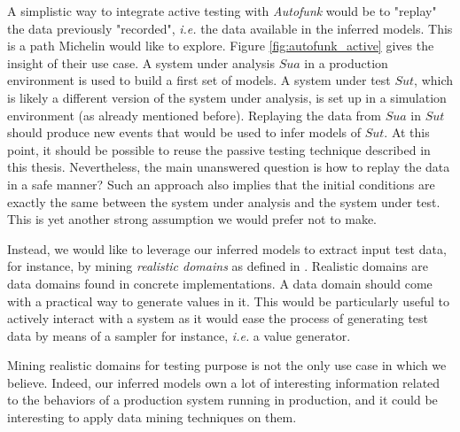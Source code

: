 A simplistic way to integrate active testing with \emph{Autofunk}
would be to "replay"
\cite{thane2000using,Orso:2005:SCR:1082983.1083251} the data
previously "recorded", \emph{i.e.} the data available in the
inferred models. This is a path Michelin would like to explore.
Figure \ref{fig:autofunk_active} gives the insight of their use
case. A system under analysis $\mathit{Sua}$ in a production
environment is used to build a first set of models. A system
under test $\mathit{Sut}$, which is likely a different version of
the system under analysis, is set up in a simulation environment
(as already mentioned before).  Replaying the data from
$\mathit{Sua}$ in $\mathit{Sut}$ should produce new events that
would be used to infer models of $\mathit{Sut}$.  At this point,
it should be possible to reuse the passive testing technique
described in this thesis.  Nevertheless, the main unanswered
question is how to replay the data in a safe manner?  Such an
approach also implies that the initial conditions are exactly the
same between the system under analysis and the system under test.
This is yet another strong assumption we would prefer not to
make.

Instead, we would like to leverage our inferred models to extract
input test data, for instance, by mining \emph{realistic domains}
as defined in \cite{Enderlin:2011:PSL:2075545.2075551}. Realistic
domains are data domains found in concrete implementations. A
data domain should come with a practical way to generate values
in it. This would be particularly useful to actively interact
with a system as it would ease the process of generating test
data by means of a sampler for instance, \emph{i.e.} a value
generator.

Mining realistic domains for testing purpose is not the only use
case in which we believe. Indeed, our inferred models own a lot
of interesting information related to the behaviors of a
production system running in production, and it could be
interesting to apply data mining techniques on them.\\

